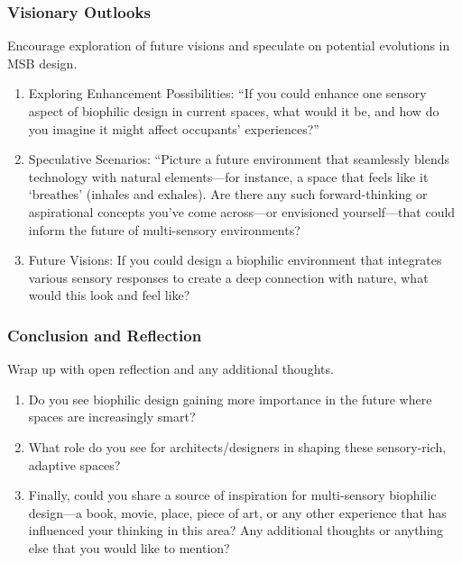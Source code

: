 \subsubsection{Visionary Outlooks} Encourage exploration of  future visions and speculate on potential evolutions in MSB design.
\begin{enumerate}
    \item Exploring Enhancement Possibilities: “If you could enhance one sensory aspect of biophilic design in current spaces, what would it be, and how do you imagine it might affect occupants’ experiences?”
    \item  Speculative Scenarios: “Picture a future environment that seamlessly blends technology with natural elements—for instance, a space that feels like it ‘breathes’ (inhales and exhales). Are there any such forward-thinking or aspirational concepts you've come across—or envisioned yourself—that could inform the future of multi-sensory environments? 
    \item Future Visions: If you could design a biophilic environment that integrates various sensory responses to create a deep connection with nature, what would this look and feel like? 
\end{enumerate}

\subsubsection{Conclusion and Reflection}
Wrap up with open reflection and any additional thoughts.
\begin{enumerate}
    \item Do you see biophilic design gaining more importance in the future where spaces are increasingly smart? 
    \item What role do you see for architects/designers in shaping these sensory-rich, adaptive spaces?
    \item Finally, could you share a source of inspiration for multi-sensory biophilic design—a book, movie, place, piece of art, or any other experience that has influenced your thinking in this area? Any additional thoughts or anything else that you would like to mention?
\end{enumerate}


